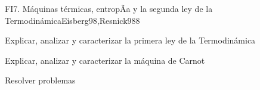 \begin{syllabus}
\begin{unit}{FI7. Máquinas térmicas, entropÃ­a y la segunda ley de la Termodinámica}{Eisberg98,Resnick98}{8}
   \begin{unitgoals}
         \item  Explicar, analizar y caracterizar la primera ley de la Termodinámica
         \item  Explicar, analizar y caracterizar la máquina de Carnot
         \item  Resolver problemas
   \end{unitgoals}
\end{unit}

\begin{coursebibliography}
\end{coursebibliography}

\end{syllabus}

%
